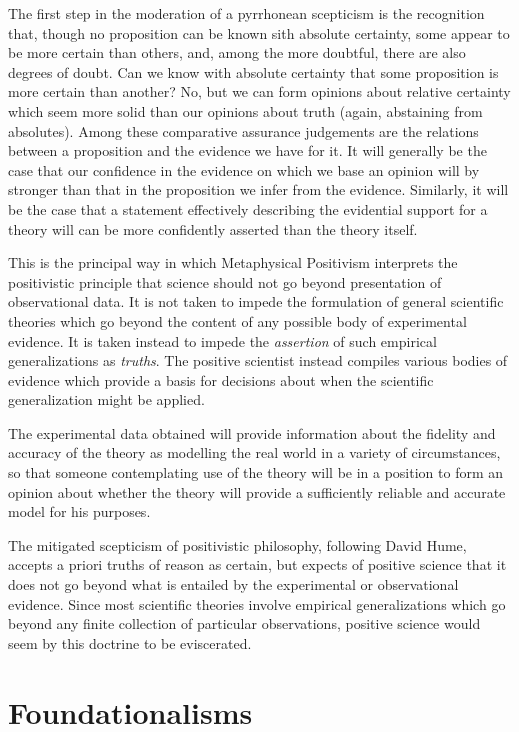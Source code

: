 The first step in the moderation of a pyrrhonean scepticism is the
recognition that, though no proposition can be known sith absolute certainty,
some appear to be more certain than others, and, among the more doubtful,
there are also degrees of doubt.
Can we know with absolute certainty that some proposition is more
certain than another?
No, but we can form opinions about relative certainty which seem
more solid than our opinions about truth (again, abstaining
from absolutes).
Among these comparative assurance judgements are the relations between
a proposition and the evidence we have for it.
It will generally be the case that our confidence in the evidence on
which we base an opinion will by stronger than that in the proposition
we infer from the evidence.
Similarly, it will be the case that a statement effectively describing
the evidential support for a theory will can be more confidently
asserted than the theory itself.

This is the principal way in which Metaphysical Positivism interprets
the positivistic principle that science should not go beyond
presentation of observational data.
It is not taken to impede the formulation of general scientific
theories which go beyond the content of any possible body of
experimental evidence.
It is taken instead to impede the \emph{assertion} of such empirical
generalizations as \emph{truths}.
The positive scientist instead compiles various bodies of evidence
which provide a basis for decisions about when the scientific
generalization might be applied.

The experimental data obtained will provide information about the
fidelity and accuracy of the theory as modelling the real world in a
variety of circumstances, so that someone contemplating use of the
theory will be in a position to form an opinion about whether the
theory will provide a sufficiently reliable and accurate model for his
purposes.

The mitigated scepticism of positivistic philosophy, following David
Hume, accepts a priori truths of reason as certain, but expects of
positive science that it does not go beyond what is entailed by the
experimental or observational evidence.
Since most scientific theories involve empirical generalizations which
go beyond any finite collection of particular observations, positive
science would seem by this doctrine to be eviscerated.

\section{Foundationalisms}


